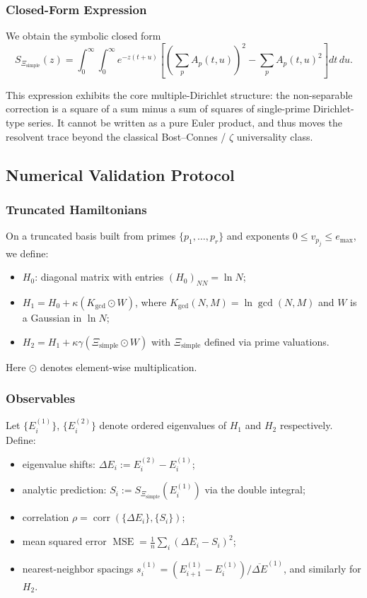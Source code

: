 \documentclass[11pt]{article}
\begin{document}
\subsubsection{Closed-Form Expression}

We obtain the symbolic closed form
\[
  \boxed{
  S_{\Xi_{\text{simple}}}(z)
    = \int_0^\infty\!\!\int_0^\infty e^{-z(t+u)}
      \left[
        \left(\sum_p A_p(t,u)\right)^2
        - \sum_p A_p(t,u)^2
      \right] dt\,du.
  }
\]

This expression exhibits the core multiple-Dirichlet structure: the
non-separable correction is a square of a sum minus a sum of squares of
single-prime Dirichlet-type series. It cannot be written as a pure
Euler product, and thus moves the resolvent trace beyond the classical
Bost--Connes / $\zeta$ universality class.

\subsection{Numerical Validation Protocol}

\subsubsection{Truncated Hamiltonians}

On a truncated basis built from primes
$\{p_1,\dots,p_r\}$ and exponents $0\le v_{p_j}\le e_{\max}$, we define:

\begin{itemize}
\item $H_0$: diagonal matrix with entries $(H_0)_{NN} = \ln N$;
\item $H_1 = H_0 + \kappa (K_{\gcd} \odot W)$, where
  $K_{\gcd}(N,M) = \ln\gcd(N,M)$ and $W$ is a Gaussian in $\ln N$;
\item $H_2 = H_1 + \kappa\gamma (\Xi_{\text{simple}} \odot W)$ with
  $\Xi_{\text{simple}}$ defined via prime valuations.
\end{itemize}

Here $\odot$ denotes element-wise multiplication.

\subsubsection{Observables}

Let $\{E_i^{(1)}\}$, $\{E_i^{(2)}\}$ denote ordered eigenvalues of
$H_1$ and $H_2$ respectively. Define:

\begin{itemize}
\item eigenvalue shifts: $\Delta E_i := E_i^{(2)} - E_i^{(1)}$;
\item analytic prediction:
  $S_i := S_{\Xi_{\text{simple}}}(E_i^{(1)})$ via the double integral;
\item correlation
  $\rho = \operatorname{corr}(\{\Delta E_i\},\{S_i\})$;
\item mean squared error
  $\operatorname{MSE} = \frac{1}{n}\sum_i (\Delta E_i - S_i)^2$;
\item nearest-neighbor spacings
  $s_i^{(1)} = (E_{i+1}^{(1)} - E_i^{(1)})/\overline{\Delta E}^{(1)}$,
  and similarly for $H_2$.
\end{itemize}
\end{document}
